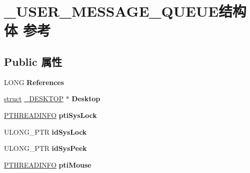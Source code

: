 \hypertarget{struct___u_s_e_r___m_e_s_s_a_g_e___q_u_e_u_e}{}\section{\+\_\+\+U\+S\+E\+R\+\_\+\+M\+E\+S\+S\+A\+G\+E\+\_\+\+Q\+U\+E\+U\+E结构体 参考}
\label{struct___u_s_e_r___m_e_s_s_a_g_e___q_u_e_u_e}
\subsection*{Public 属性}
\begin{DoxyCompactItemize}
\item 
\mbox{\label{struct___u_s_e_r___m_e_s_s_a_g_e___q_u_e_u_e_aafbe607c638565eabd1adaed452c4ed4}} 
L\+O\+NG {\bfseries References}
\item 
\mbox{\label{struct___u_s_e_r___m_e_s_s_a_g_e___q_u_e_u_e_ac6aa06a02eccfd4688ec6fb4780320bb}} 
\hyperlink{interfacestruct}{struct} \hyperlink{struct___d_e_s_k_t_o_p}{\+\_\+\+D\+E\+S\+K\+T\+OP} $\ast$ {\bfseries Desktop}
\item 
\mbox{\label{struct___u_s_e_r___m_e_s_s_a_g_e___q_u_e_u_e_a7a7af77b6fa2cee54bb17b82525b5b07}} 
\hyperlink{struct___t_h_r_e_a_d_i_n_f_o}{P\+T\+H\+R\+E\+A\+D\+I\+N\+FO} {\bfseries pti\+Sys\+Lock}
\item 
\mbox{\label{struct___u_s_e_r___m_e_s_s_a_g_e___q_u_e_u_e_a936301c2392332f0f71b0b34c0e9cb0b}} 
U\+L\+O\+N\+G\+\_\+\+P\+TR {\bfseries id\+Sys\+Lock}
\item 
\mbox{\label{struct___u_s_e_r___m_e_s_s_a_g_e___q_u_e_u_e_a6539a3de91f50caa72cd58e41b9378fc}} 
U\+L\+O\+N\+G\+\_\+\+P\+TR {\bfseries id\+Sys\+Peek}
\item 
\mbox{\label{struct___u_s_e_r___m_e_s_s_a_g_e___q_u_e_u_e_a9e1afa794ab735e9e9adaf6556d273b7}} 
\hyperlink{struct___t_h_r_e_a_d_i_n_f_o}{P\+T\+H\+R\+E\+A\+D\+I\+N\+FO} {\bfseries pti\+Mouse}

\end{DoxyCompactItemize}
